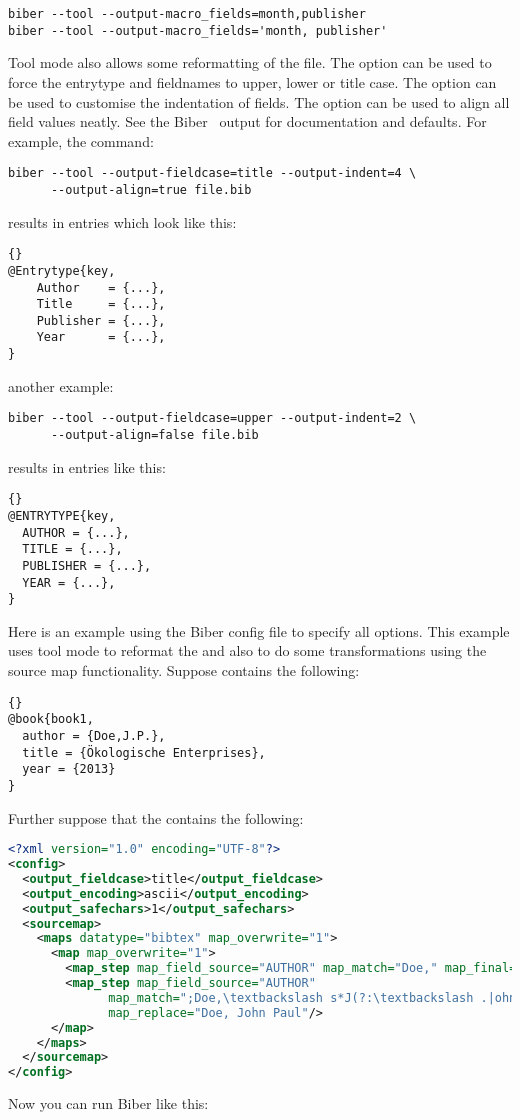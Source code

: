\documentclass{ltxdockit}
\newcommand*{\biber}{Biber\xspace}
\begin{document}
\begin{verbatim}
biber --tool --output-macro_fields=month,publisher
biber --tool --output-macro_fields='month, publisher'
\end{verbatim}

Tool mode also allows some reformatting of the  file. The
option  can be used to force the entrytype and
fieldnames to upper, lower or title case. The option
 can be used to customise the indentation of
fields. The option  can be used to align all field
values neatly. See the \biber\  output for documentation
and defaults. For example, the command:

\begin{verbatim}
biber --tool --output-fieldcase=title --output-indent=4 \
      --output-align=true file.bib
\end{verbatim}
%
results in  entries which look like this:

\begin{lstlisting}[style=bibtex, columns=fixed]{}
@Entrytype{key,
    Author    = {...},
    Title     = {...},
    Publisher = {...},
    Year      = {...},
}
\end{lstlisting}
%
another example:
\begin{verbatim}
biber --tool --output-fieldcase=upper --output-indent=2 \
      --output-align=false file.bib
\end{verbatim}
%
results in entries like this:

\begin{lstlisting}[style=bibtex]{}
@ENTRYTYPE{key,
  AUTHOR = {...},
  TITLE = {...},
  PUBLISHER = {...},
  YEAR = {...},
}
\end{lstlisting}
%
Here is an example using the \biber config file to specify all options.
This example uses tool mode to reformat the  and also to do some
transformations using the source map functionality. Suppose
\file{test.bib} contains the following:

\begin{lstlisting}[style=bibtex]{}
@book{book1,
  author = {Doe,J.P.},
  title = {Ökologische Enterprises},
  year = {2013}
}
\end{lstlisting}
%
Further suppose that the  contains the following:

\begin{lstlisting}[language=xml,escapechar=;,mathescape=true]
<?xml version="1.0" encoding="UTF-8"?>
<config>
  <output_fieldcase>title</output_fieldcase>
  <output_encoding>ascii</output_encoding>
  <output_safechars>1</output_safechars>
  <sourcemap>
    <maps datatype="bibtex" map_overwrite="1">
      <map map_overwrite="1">
        <map_step map_field_source="AUTHOR" map_match="Doe," map_final="1"/>
        <map_step map_field_source="AUTHOR"
              map_match=";Doe,\textbackslash s*J(?:\textbackslash .|ohn)(?:[-]*)(?:P\textbackslash .|Paul)*;"
              map_replace="Doe, John Paul"/>
      </map>
    </maps>
  </sourcemap>
</config>
\end{lstlisting}
%
Now you can run \biber like this:
\end{document}
